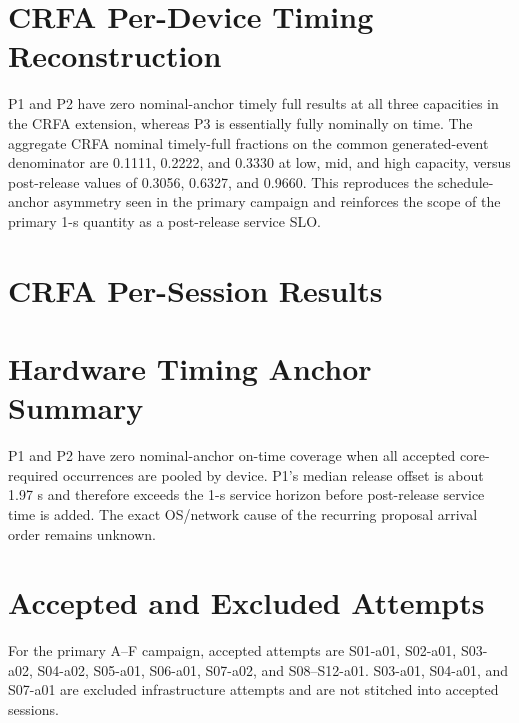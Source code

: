 \documentclass[10pt,onecolumn]{IEEEtran}
\begin{document}
\section{CRFA Per-Device Timing Reconstruction}
\begin{table}[h]
\centering
\caption{CRFA selected-full timing by device. Nominal on-time refers to the schedule-inclusive anchor; post-release on-time uses actual event creation.}
\label{tab:supp_crfa_timing}

\end{table}
P1 and P2 have zero nominal-anchor timely full results at all three
capacities in the CRFA extension, whereas P3 is essentially fully nominally
on time. The aggregate CRFA nominal timely-full fractions on the common
generated-event denominator are 0.1111, 0.2222, and 0.3330 at low, mid, and
high capacity, versus post-release values of 0.3056, 0.6327, and 0.9660. This
reproduces the schedule-anchor asymmetry seen in the primary campaign and
reinforces the scope of the primary 1-s quantity as a post-release service
SLO.

\section{CRFA Per-Session Results}
\small
\begin{table}[h]
\centering
\caption{CRFA session-level timely full-core output and frontier attainment.}
\label{tab:supp_crfa_sessions}

\end{table}
\normalsize

\section{Hardware Timing Anchor Summary}
\begin{table}[H]\centering\caption{Accepted hardware core-required timing by probe.}

\end{table}
P1 and P2 have zero nominal-anchor on-time coverage when all accepted
core-required occurrences are pooled by device. P1's median release offset is
about 1.97 s and therefore exceeds the 1-s service horizon before post-release
service time is added. The exact OS/network cause of the recurring proposal
arrival order remains unknown.

\section{Accepted and Excluded Attempts}
For the primary A--F campaign, accepted attempts are S01-a01, S02-a01,
S03-a02, S04-a02, S05-a01, S06-a01, S07-a02, and S08--S12-a01. S03-a01,
S04-a01, and S07-a01 are excluded infrastructure attempts and are not
stitched into accepted sessions.
\end{document}
